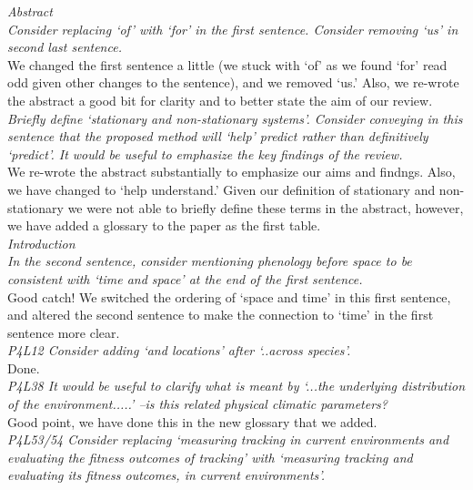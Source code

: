 \documentclass[11pt]{article}
\begin{document}
\emph{ Abstract\\
Consider replacing `of' with `for' in the first sentence. Consider removing `us' in second
last sentence.}\\

We changed the first sentence a little (we stuck with `of' as we found `for' read odd given other changes to the sentence), and we removed `us.' Also, we re-wrote the abstract a good bit for clarity and to better state the aim of our review. \\

\emph{Briefly define `stationary and non-stationary systems'. Consider conveying in this sentence
that the proposed method will `help' predict rather than definitively `predict'. It would be
useful to emphasize the key findings of the review.}\\

We re-wrote the abstract substantially to emphasize our aims and findngs. Also, we have changed to `help understand.' Given our definition of stationary and non-stationary we were not able to briefly define these terms in the abstract, however, we have added a glossary to the paper as the first table. \\

\emph{Introduction\\
In the second sentence, consider mentioning phenology before space to be consistent with
`time and space' at the end of the first sentence.}\\

Good catch! We switched the ordering of `space and time' in this first sentence, and altered the second sentence to make the connection to `time' in the first sentence more clear.\\

\emph{P4L12 Consider adding `and locations' after `..across species'.}\\

Done.\\

\emph{P4L38 It would be useful to clarify what is meant by `...the underlying distribution of the
environment.....' –is this related physical climatic parameters? }\\

Good point, we have done this in the new glossary that we added.\\

\emph{P4L53/54 Consider replacing `measuring tracking in current environments and evaluating the
fitness outcomes of tracking' with `measuring tracking and evaluating its fitness outcomes,
in current environments'. }\\
\end{document}
